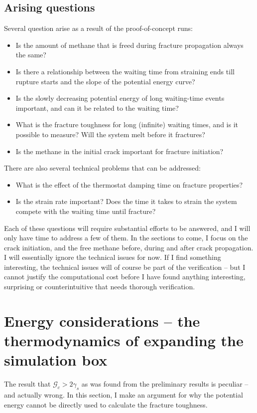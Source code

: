 \subsection{Arising questions}
Several question arise as a result of the proof-of-concept runs:
\begin{itemize}
\item Is the amount of methane that is freed during fracture propagation always the same?
\item Is there a relationship between the waiting time from straining ends till rupture starts and the slope of the potential energy curve?
\item Is the slowly decreasing potential energy of long waiting-time events important, and can it be related to the waiting time?
\item What is the fracture toughness for long (infinite) waiting times, and is it possible to measure? Will the system melt before it fractures?
\item Is the methane in the initial crack important for fracture initiation?
\end{itemize}

There are also several technical problems that can be addressed:
\begin{itemize}
\item What is the effect of the thermostat damping time on fracture properties?
\item Is the strain rate important? Does the time it takes to strain the system compete with the waiting time until fracture?
\end{itemize}

Each of these questions will require substantial efforts to be answered, and I will only have time to address a few of them. In the sections to come, I focus on the crack initiation, and the free methane before, during and after crack propagation. I will essentially ignore the technical issues for now. If I find something interesting, the technical issues will of course be part of the verification -- but I cannot justify the computational cost before I have found anything interesting, surprising or counterintuitive that needs thorough verification.

\section{Energy considerations -- the thermodynamics of expanding the simulation box}
\label{sec:energy_considerations}
The result that $\mathcal{G}_c > 2\gamma_s$ as was found from the preliminary results is peculiar -- and actually wrong. In this section, I make an argument for why the potential energy cannot be directly used to calculate the fracture toughness.

